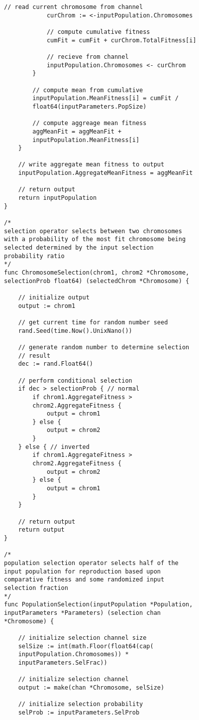 \begin{lstlisting}[basicstyle=\small]
			// read current chromosome from channel
			curChrom := <-inputPopulation.Chromosomes

			// compute cumulative fitness
			cumFit = cumFit + curChrom.TotalFitness[i]

			// recieve from channel
			inputPopulation.Chromosomes <- curChrom
		}

		// compute mean from cumulative
		inputPopulation.MeanFitness[i] = cumFit / 
		float64(inputParameters.PopSize)

		// compute aggreage mean fitness
		aggMeanFit = aggMeanFit + 
		inputPopulation.MeanFitness[i]
	}

	// write aggregate mean fitness to output
	inputPopulation.AggregateMeanFitness = aggMeanFit

	// return output
	return inputPopulation
}

/* 
selection operator selects between two chromosomes 
with a probability of the most fit chromosome being 
selected determined by the input selection 
probability ratio
*/
func ChromosomeSelection(chrom1, chrom2 *Chromosome, 
selectionProb float64) (selectedChrom *Chromosome) {

	// initialize output
	output := chrom1

	// get current time for random number seed
	rand.Seed(time.Now().UnixNano())

	// generate random number to determine selection 
	// result
	dec := rand.Float64()

	// perform conditional selection
	if dec > selectionProb { // normal
		if chrom1.AggregateFitness > 
		chrom2.AggregateFitness {
			output = chrom1
		} else {
			output = chrom2
		}
	} else { // inverted
		if chrom1.AggregateFitness > 
		chrom2.AggregateFitness {
			output = chrom2
		} else {
			output = chrom1
		}
	}

	// return output
	return output
}

/* 
population selection operator selects half of the 
input population for reproduction based upon 
comparative fitness and some randomized input 
selection fraction
*/
func PopulationSelection(inputPopulation *Population, 
inputParameters *Parameters) (selection chan 
*Chromosome) {

	// initialize selection channel size
	selSize := int(math.Floor(float64(cap(
	inputPopulation.Chromosomes)) * 
	inputParameters.SelFrac))

	// initialize selection channel
	output := make(chan *Chromosome, selSize)

	// initialize selection probability
	selProb := inputParameters.SelProb


\end{lstlisting}
